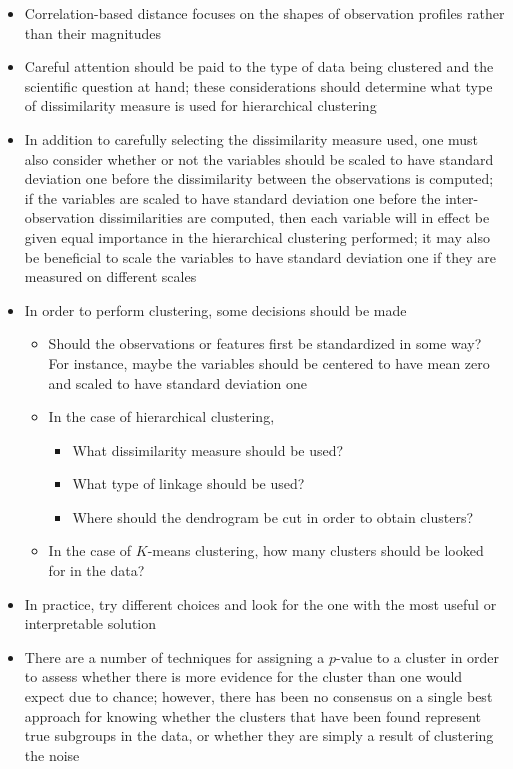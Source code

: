 \documentclass[12pt]{article}
\begin{document}
\begin{itemize}
\item Correlation-based distance focuses on the shapes of observation profiles rather than their magnitudes 
\item Careful attention should be paid to the type of data being clustered and the scientific question at hand; these considerations should determine what type of dissimilarity measure is used for hierarchical clustering 
\item In addition to carefully selecting the dissimilarity measure used, one must also consider whether or not the variables should be scaled to have standard deviation one before the dissimilarity between the observations is computed; if the variables are scaled to have standard deviation one before the inter-observation dissimilarities are computed, then each variable will in effect be given equal importance in the hierarchical clustering performed; it may also be beneficial to scale the variables to have standard deviation one if they are measured on different scales 
\item In order to perform clustering, some decisions should be made \begin{itemize} 
\item Should the observations or features first be standardized in some way? For instance, maybe the variables should be centered to have mean zero and scaled to have standard deviation one
\item In the case of hierarchical clustering, \begin{itemize} 
\item What dissimilarity measure should be used?
\item What type of linkage should be used? 
\item Where should the dendrogram be cut in order to obtain clusters? \end{itemize} 
\item In the case of $K$-means clustering, how many clusters should be looked for in the data? \end{itemize} 
\item  In practice, try different choices and look for the one with the most useful or interpretable solution
\item There are a number of techniques for assigning a $p$-value to a cluster in order to assess whether there is more evidence for the cluster than one would expect due to chance; however, there has been no consensus on a single best approach for knowing whether the clusters that have been found represent true subgroups in the data, or whether they are simply a result of clustering the noise 

\end{itemize}
\end{document}
